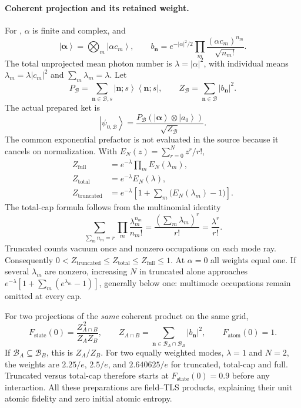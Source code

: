\documentclass[11pt,a4paper]{article}
\newcommand{\ket}[1]{\left|#1\right\rangle}
\newcommand{\bra}[1]{\left\langle#1\right|}
\newcommand{\code}[1]{\texttt{\detokenize{#1}}}
\newcommand{\B}{\mathcal B}
\begin{document}
\paragraph{Coherent projection and its retained weight.}
For \code{state='coherent'}, $\alpha$ is finite and complex, and
\begin{equation}
 \ket{\boldsymbol\alpha}=\bigotimes_m\ket{\alpha c_m},\qquad
 b_{\bm n}=e^{-|\alpha|^2/2}
          \prod_m\frac{(\alpha c_m)^{n_m}}{\sqrt{n_m!}}.
 \label{eq:coherentcoeff}
\end{equation}
The total unprojected mean photon number is $\lambda=|\alpha|^2$, with
individual means $\lambda_m=\lambda|c_m|^2$ and $\sum_m\lambda_m=\lambda$.
Let
\begin{equation}
 P_\B=\sum_{\bm n\in\B,s}\ket{\bm n;s}\bra{\bm n;s},\qquad
 Z_\B=\sum_{\bm n\in\B}|b_{\bm n}|^2.
\end{equation}
The actual prepared ket is
\begin{equation}
 \ket{\psi_{0,\B}}=
 \frac{P_\B(\ket{\boldsymbol\alpha}\otimes\ket{a_0})}{\sqrt{Z_\B}}.
 \label{eq:coherent}
\end{equation}
The common exponential prefactor is not evaluated in the source because it
cancels on normalization. With $E_N(z)=\sum_{r=0}^N z^r/r!$,
\begin{align}
 Z_{\mathrm{full}}&=e^{-\lambda}\prod_m E_N(\lambda_m),\\
 Z_{\mathrm{total}}&=e^{-\lambda}E_N(\lambda),\\
 Z_{\mathrm{truncated}}&=e^{-\lambda}
       \left[1+\sum_m\big(E_N(\lambda_m)-1\big)\right].
 \label{eq:weights}
\end{align}
The total-cap formula follows from the multinomial identity
\begin{equation}
 \sum_{\sum_m n_m=r}\prod_m\frac{\lambda_m^{n_m}}{n_m!}
       =\frac{(\sum_m\lambda_m)^r}{r!}=\frac{\lambda^r}{r!}.
\end{equation}
Truncated counts vacuum once and nonzero occupations on each mode ray.
Consequently $0<Z_{\mathrm{truncated}}\leq Z_{\mathrm{total}}
\leq Z_{\mathrm{full}}\leq1$. At $\alpha=0$ all weights equal one.
If several $\lambda_m$ are nonzero, increasing $N$ in truncated alone
approaches $e^{-\lambda}[1+\sum_m(e^{\lambda_m}-1)]$, generally below one:
multimode occupations remain omitted at every cap.

For two projections of the \emph{same} coherent product on the same grid,
\begin{equation}
 F_{\mathrm{state}}(0)=\frac{Z_{A\cap B}^{\,2}}{Z_AZ_B},\qquad
 Z_{A\cap B}=\sum_{\bm n\in\B_A\cap\B_B}|b_{\bm n}|^2,
 \qquad F_{\mathrm{atom}}(0)=1.
 \label{eq:initialf}
\end{equation}
If $\B_A\subseteq\B_B$, this is $Z_A/Z_B$. For two equally weighted modes,
$\lambda=1$ and $N=2$, the weights are $2.25/e$, $2.5/e$, and
$2.640625/e$ for truncated, total-cap and full. Truncated versus total-cap
therefore starts at $F_{\mathrm{state}}(0)=0.9$ before any interaction.
All these preparations are field--TLS products, explaining their unit
atomic fidelity and zero initial atomic entropy.
\end{document}
